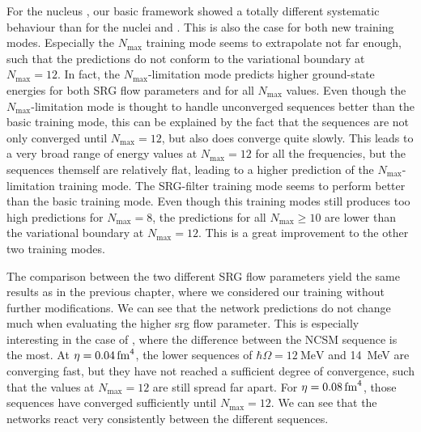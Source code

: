 For the nucleus , our basic framework showed a totally different systematic behaviour than for the nuclei  and . This is also the case for both new training modes. Especially the $N_\mathrm{max}$ training mode seems to extrapolate not far enough, such that the predictions do not conform to the variational boundary at $N_\mathrm{max} = 12$. In fact, the $N_\mathrm{max}$-limitation mode predicts higher ground-state energies for both SRG flow parameters and for all $N_\mathrm{max}$ values. Even though the $N_\mathrm{max}$-limitation mode is thought to handle unconverged sequences better than the basic training mode, this can be explained by the fact that the  sequences are not only converged until $N_\mathrm{max} = 12$, but also does converge quite slowly. This leads to a very broad range of energy values at $N_\mathrm{max} = 12$ for all the frequencies, but the sequences themself are relatively flat, leading to a higher prediction of the $N_\mathrm{max}$-limitation training mode. The SRG-filter training mode seems to perform better than the basic training mode. Even though this training modes still produces too high predictions for $N_\mathrm{max} = 8$, the predictions for all $N_\mathrm{max} \geq 10$ are lower than the variational boundary at $N_\mathrm{max} = 12$. This is a great improvement to the other two training modes.

The comparison between the two different SRG flow parameters yield the same results as in the previous chapter, where we considered our training without further modifications. We can see that the network predictions do not change much when evaluating the higher srg flow parameter. This is especially interesting in the case of , where the difference between the NCSM sequence is the most. At $\eta = \srg{0.04}$, the lower sequences of $\hbar \Omega = \SI{12}{\mega\electronvolt}$ and \SI{14}{\mega\electronvolt} are converging fast, but they have not reached a sufficient degree of convergence, such that the values at $N_\mathrm{max} = 12$ are still spread far apart. For $\eta = \srg{0.08}$, those sequences have converged sufficiently until $N_\mathrm{max} = 12$. We can see that the networks react very consistently between the different sequences.



